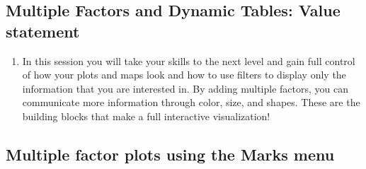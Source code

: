 \documentclass[
]{book}
\providecommand{\tightlist}{%
  \setlength{\itemsep}{0pt}\setlength{\parskip}{0pt}}
\begin{document}
\hypertarget{multiple-factors-and-dynamic-tables-value-statement}{%
\subsection{Multiple Factors and Dynamic Tables: Value statement}\label{multiple-factors-and-dynamic-tables-value-statement}}

\begin{enumerate}
\def\labelenumi{\arabic{enumi}.}
\tightlist
\item
  In this session you will take your skills to the next level and gain full control of how your plots and maps look and how to use filters to display only the information that you are interested in. By adding multiple factors, you can communicate more information through color, size, and shapes. These are the building blocks that make a full interactive visualization!
\end{enumerate}

\hypertarget{multiple-factor-plots-using-the-marks-menu}{%
\subsection{Multiple factor plots using the Marks menu}\label{multiple-factor-plots-using-the-marks-menu}}
\end{document}
